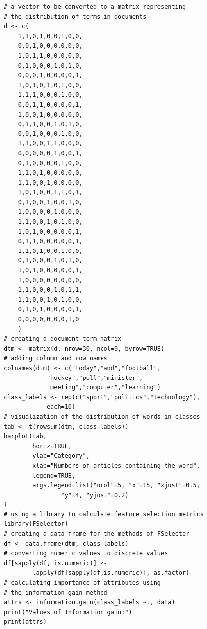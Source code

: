 \begin{verbatim}
# a vector to be converted to a matrix representing
# the distribution of terms in documents
d <- c(
    1,1,0,1,0,0,1,0,0,
    0,0,1,0,0,0,0,0,0,
    1,0,1,1,0,0,0,0,0,
    0,1,0,0,0,1,0,1,0,
    0,0,0,1,0,0,0,0,1,
    1,0,1,0,1,0,1,0,0,
    1,1,1,0,0,0,1,0,0,
    0,0,1,1,0,0,0,0,1,
    1,0,0,1,0,0,0,0,0,
    0,1,1,0,0,1,0,1,0,
    0,0,1,0,0,0,1,0,0,
    1,1,0,0,1,1,0,0,0,
    0,0,0,0,0,1,0,0,1,
    0,1,0,0,0,0,1,0,0,
    1,1,0,1,0,0,0,0,0,
    1,1,0,0,1,0,0,0,0,
    1,0,1,0,0,1,1,0,1,
    0,1,0,0,1,0,0,1,0,
    1,0,0,0,0,1,0,0,0,
    1,1,0,0,1,0,1,0,0,
    1,0,1,0,0,0,0,0,1,
    0,1,1,0,0,0,0,0,1,
    1,1,0,1,0,0,1,0,0,
    0,1,0,0,0,1,0,1,0,
    1,0,1,0,0,0,0,0,1,
    1,0,0,0,0,0,0,0,0,
    1,1,0,0,0,1,0,1,1,
    1,1,0,0,1,0,1,0,0,
    0,1,0,1,0,0,0,0,1,
    0,0,0,0,0,0,0,1,0
    )
# creating a document-term matrix
dtm <- matrix(d, nrow=30, ncol=9, byrow=TRUE)
# adding column and row names
colnames(dtm) <- c("today","and","football",
            "hockey","poll","minister",
            "meeting","computer","learning")
class_labels <- rep(c("sport","politics","technology"),
            each=10)
# visualization of the distribution of words in classes
tab <- t(rowsum(dtm, class_labels))
barplot(tab,
        horiz=TRUE,
        ylab="Category",
        xlab="Numbers of articles containing the word",
        legend=TRUE,
        args.legend=list("ncol"=5, "x"=15, "xjust"=0.5,
                "y"=4, "yjust"=0.2)
)
# using a library to calculate feature selection metrics
library(FSelector)
# creating a data frame for the methods of FSelector
df <- data.frame(dtm, class_labels)
# converting numeric values to discrete values
df[sapply(df, is.numeric)] <-
        lapply(df[sapply(df,is.numeric)], as.factor)
# calculating importance of attributes using
# the information gain method
attrs <- information.gain(class_labels ~., data)
print("Values of Information gain:")
print(attrs)
\end{verbatim}

